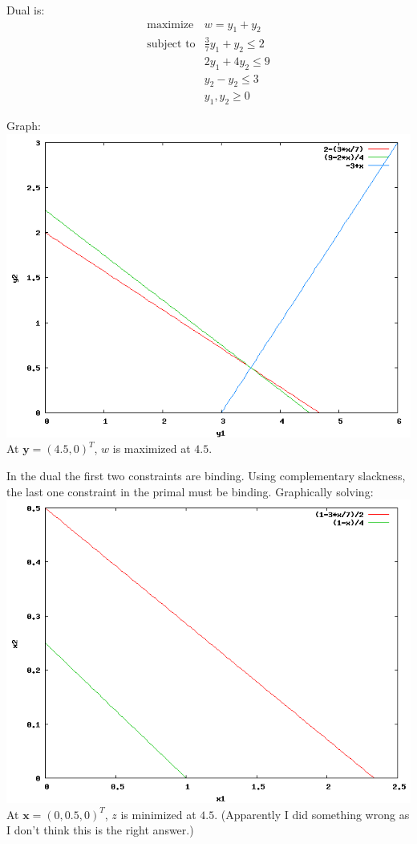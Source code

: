\documentclass{article}
\begin{document}
Dual is: \\
\begin{displaymath}
\begin{array}{ll}
\textrm{maximize} & w = y_1 + y_2 \\
\textrm{subject to} & \frac{3}{7}y_1 + y_2 \le 2 \\
& 2y_1 + 4y_2 \le 9 \\
& y_2 - y_2 \le 3 \\
& y_1, y_2 \ge 0
\end{array}
\end{displaymath}

Graph: \\
\includegraphics[width=0.4\linewidth]{4a} \\
At $\mathbf{y} = (4.5, 0)^T$, $w$ is maximized at $4.5$. \\

\newpage

In the dual the first two constraints are binding. Using complementary slackness, the last one constraint in the primal must be binding. Graphically solving: \\
\includegraphics[width=0.4\linewidth]{4b} \\
At $\mathbf{x} = (0, 0.5, 0)^T$, $z$ is minimized at $4.5$. (Apparently I did something wrong as I don't think this is the right answer.)\\
\end{document}
